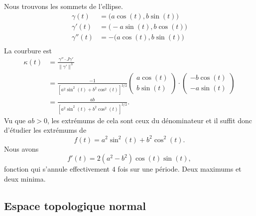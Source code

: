 \begin{example}
	Nous trouvons les sommets de l'ellipse.
	\begin{subequations}
		\begin{align}
			\gamma(t)   & =\big( a\cos(t),b\sin(t) \big)  \\
			\gamma'(t)  & =\big( -a\sin(t),b\cos(t) \big) \\
			\gamma''(t) & =-\big( a\cos(t),b\sin(t) \big) \\
		\end{align}
	\end{subequations}
	La courbure est
	\begin{subequations}
		\begin{align}
			\kappa(t) & =\frac{ \gamma''\cdot J\gamma' }{ \| \gamma' \|^3 }                                                        \\
			          & =\frac{-1}{ [a^2\sin^2(t)+b^2\cos^2(t)]^{3/2} }\begin{pmatrix}
				a\cos(t) \\
				b\sin(t)
			\end{pmatrix}\cdot\begin{pmatrix}
				-b\cos(t) \\
				-a\sin(t)
			\end{pmatrix} \\
			          & =\frac{ ab }{  [a^2\sin^2(t)+b^2\cos^2(t)]^{3/2}  }.
		\end{align}
	\end{subequations}
	Vu que \( ab>0\), les extrémums de cela sont ceux du dénominateur et il suffit donc d'étudier les extrémums de
	\begin{equation}
		f(t)=a^2\sin^2(t)+b^2\cos^2(t).
	\end{equation}
	Nous avons
	\begin{equation}
		f'(t)=2(a^2-b^2)\cos(t)\sin(t),
	\end{equation}
	fonction qui s'annule effectivement \( 4\) fois sur une période. Deux maximums et deux minima.
\end{example}


\subsection{Espace topologique normal}

